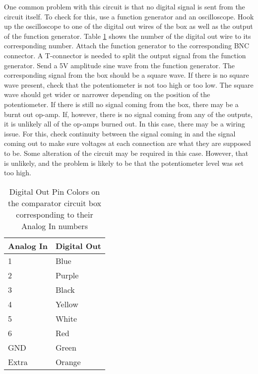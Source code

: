 One common problem with this circuit is that no digital signal is sent from the circuit itself. To check for this, use a function generator and an oscilloscope. Hook up the oscilloscope to one of the digital out wires of the box as well as the output of the function generator. Table \ref{Table:pins} shows the number of the digital out wire to its corresponding number. Attach the function generator to the corresponding BNC connector. A T-connector is needed to split the output signal from the function generator. Send a 5V amplitude sine wave from the function generator. The corresponding signal from the box should be a square wave. If there is no square wave present, check that the potentiometer is not too high or too low. The square wave should get wider or narrower depending on the position of the potentiometer. If there is still no signal coming from the box, there may be a burnt out op-amp. If, however, there is no signal coming from any of the outputs, it is unlikely all of the op-amps burned out. In this case, there may be a wiring issue. For this, check continuity between the signal coming in and the signal coming out to make sure voltages at each connection are what they are supposed to be. Some alteration of the circuit may be required in this case. However, that is unlikely, and the problem is likely to be that the potentiometer level was set too high.

\begin{table}[]
\centering
\caption[Digital Pin Out Colors]{Digital Out Pin Colors on the comparator circuit box corresponding to their Analog In numbers}
\label{Table:pins}
\begin{tabular}{l|l}

Analog In & Digital Out \\ \hline
1        & Blue       \\ 
2        & Purple     \\ 
3        & Black       \\ 
4        & Yellow       \\ 
5 		 & White		\\
6 		 & Red	      \\
GND      & Green	\\
Extra    & Orange	\\
\end{tabular}
\end{table}

